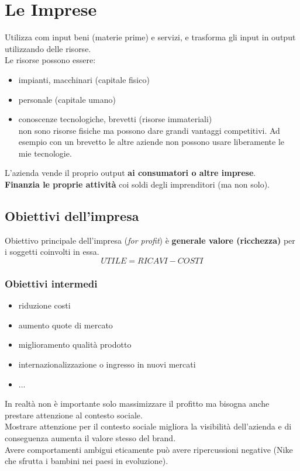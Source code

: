 \documentclass[12pt, letterpaper]{article}
\begin{document}
	\section{Le Imprese}
	
		Utilizza com input beni (materie prime) e servizi, e trasforma gli input in output utilizzando delle risorse.\\
		Le risorse possono essere:
			
			\begin{itemize}
				\item impianti, macchinari (capitale fisico)
				\item personale (capitale umano)
				\item conoscenze tecnologiche, brevetti (risorse immateriali)\\
					non sono risorse fisiche ma possono dare grandi vantaggi competitivi. Ad esempio con un brevetto le altre aziende non possono usare liberamente le mie tecnologie.
			\end{itemize}
	
		L'azienda vende il proprio output \textbf{ai consumatori o altre imprese}.\\
		\textbf{Finanzia le proprie attività} coi soldi degli imprenditori (ma non solo).
		
		
	\subsection{Obiettivi dell'impresa}
	
		Obiettivo principale dell'impresa (\emph{for profit}) è \textbf{generale valore (ricchezza)} per i soggetti coinvolti in essa.
		$$ UTILE = RICAVI - COSTI $$
		
		\subsubsection{Obiettivi intermedi}
		
			\begin{itemize}
				\item riduzione costi
				\item aumento quote di mercato
				\item miglioramento qualità prodotto
				\item internazionalizzazione o ingresso in nuovi mercati
				\item ...
			\end{itemize}
		
		In realtà non è importante solo massimizzare il profitto ma bisogna anche prestare attenzione al contesto sociale.\\
		Mostrare attenzione per il contesto sociale migliora la visibilità dell'azienda e di conseguenza aumenta il valore stesso del brand.\\
		Avere comportamenti ambigui eticamente può avere ripercussioni negative (Nike che sfrutta i bambini nei paesi in evoluzione).
		
		
		
		
		
		
		
		
		
		
		
		
		
	
\end{document}
